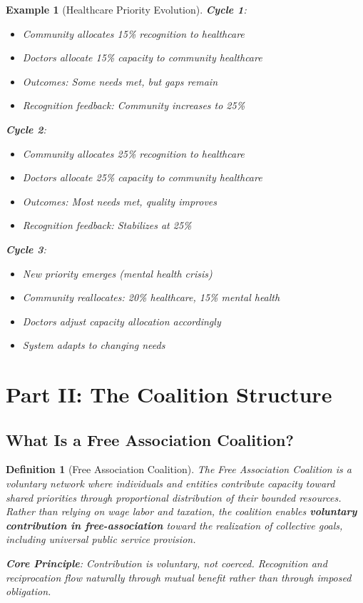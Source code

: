 \documentclass[11pt]{article}
\newtheorem{definition}{Definition}
\newtheorem{example}{Example}
\begin{document}
\begin{example}[Healthcare Priority Evolution]
\textbf{Cycle 1}:
\begin{itemize}
\item Community allocates 15\% recognition to healthcare
\item Doctors allocate 15\% capacity to community healthcare
\item Outcomes: Some needs met, but gaps remain
\item Recognition feedback: Community increases to 25\%
\end{itemize}

\textbf{Cycle 2}:
\begin{itemize}
\item Community allocates 25\% recognition to healthcare
\item Doctors allocate 25\% capacity to community healthcare
\item Outcomes: Most needs met, quality improves
\item Recognition feedback: Stabilizes at 25\%
\end{itemize}

\textbf{Cycle 3}:
\begin{itemize}
\item New priority emerges (mental health crisis)
\item Community reallocates: 20\% healthcare, 15\% mental health
\item Doctors adjust capacity allocation accordingly
\item System adapts to changing needs
\end{itemize}
\end{example}

\section{Part II: The Coalition Structure}

\subsection{What Is a Free Association Coalition?}

\begin{definition}[Free Association Coalition]
The Free Association Coalition is a voluntary network where individuals and entities contribute capacity toward shared priorities through proportional distribution of their bounded resources. Rather than relying on wage labor and taxation, the coalition enables \textbf{voluntary contribution in free-association} toward the realization of collective goals, including universal public service provision.

\textbf{Core Principle}: Contribution is voluntary, not coerced. Recognition and reciprocation flow naturally through mutual benefit rather than through imposed obligation.
\end{definition}
\end{document}
